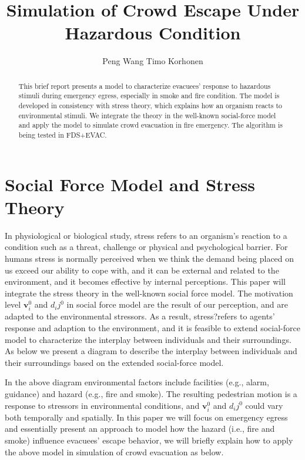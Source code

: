 \documentclass{article}
\begin{document}
\title{Simulation of Crowd Escape Under Hazardous Condition}
\author{Peng Wang      Timo Korhonen}%


\maketitle

\begin{abstract}
This brief report presents a model to characterize evacuees' response to hazardous stimuli during emergency egress, especially in smoke and fire condition.  The model is developed in consistency with stress theory, which explains how an organism reacts to environmental stimuli.  We integrate the theory in the well-known social-force model and apply the model to simulate crowd evacuation in fire emergency.  The algorithm is being tested in FDS+EVAC.  
\end{abstract}



\section{Social Force Model and Stress Theory}

In physiological or biological study, stress refers to an organism's reaction to a condition such as a threat, challenge or physical and psychological barrier.  For humans stress is normally perceived when we think the demand being placed on us exceed our ability to cope with, and it can be external and related to the environment, and it becomes effective by internal perceptions.  This paper will integrate the stress theory in the well-known social force model.  The motivation level $\mathbf{v}_i^0$ and $d_ij^0$ in social force model are the result of our perception, and are adapted to the environmental stressors.  As a result, stress?refers to agents' response and adaption to the environment, and it is feasible to extend social-force model to characterize the interplay between individuals and their surroundings.  As below we present a diagram to describe the interplay between individuals and their surroundings based on the extended social-force model.  

In the above diagram environmental factors include facilities (e.g., alarm, guidance) and hazard (e.g., fire and smoke).  The resulting pedestrian motion is a response to stressors in environmental conditions, and $\mathbf{v}_i^0$ and $d_ij^0$ could vary both temporally and spatially.  In this paper we will focus on emergency egress and essentially present an approach to model how the hazard (i.e., fire and smoke) influence evacuees' escape behavior, we will briefly explain how to apply the above model in simulation of crowd evacuation as below.  
\end{document}
